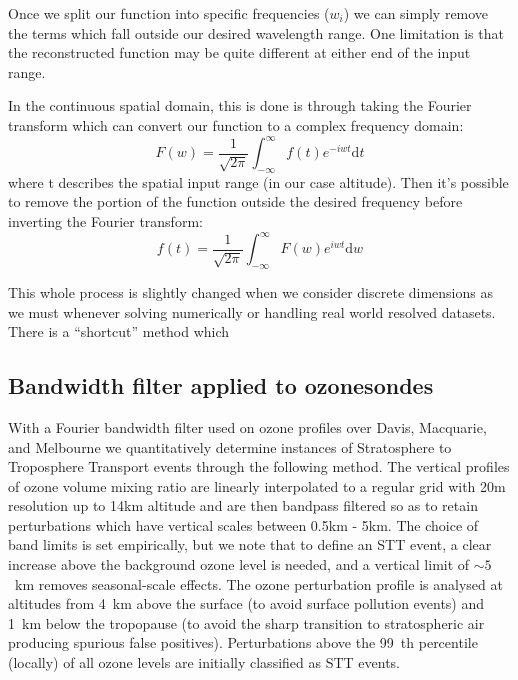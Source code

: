     Once we split our function into specific frequencies ($w_i$) we can simply remove the terms which fall outside our desired wavelength range.
    One limitation is that the reconstructed function may be quite different at either end of the input range.
    
    In the continuous spatial domain, this is done is through taking the Fourier transform which can convert our function to a complex frequency domain:
    \begin{equation*}
      F(w) = \frac{1}{\sqrt{2\pi}}\int_{-\infty}^{\infty}{ f(t) e^{-iwt} \mathrm{d}t }
    \end{equation*}
    where t describes the spatial input range (in our case altitude).
    Then it's possible to remove the portion of the function outside the desired frequency before inverting the Fourier transform:
    \begin{equation*}
      f(t) = \frac{1}{\sqrt{2\pi}}\int_{-\infty}^{\infty}{ F(w) e^{iwt} \mathrm{d}w }
    \end{equation*}
    
    This whole process is slightly changed when we consider discrete dimensions as we must whenever solving numerically or handling real world resolved datasets.
    There is a ``shortcut'' method which 
    
    
  \subsection{Bandwidth filter applied to ozonesondes}
    
    With a Fourier bandwidth filter used on ozone profiles over Davis, Macquarie, and Melbourne we quantitatively determine instances of Stratosphere to Troposphere Transport events through the following method.
    The vertical profiles of ozone volume mixing ratio are linearly interpolated to a regular grid with 20m resolution up to 14km altitude and are then bandpass filtered so as to retain perturbations which have vertical scales between 0.5km - 5km. 
    The choice of band limits is set empirically, but we note that to define an STT event, a clear increase above the background ozone level is needed, and a vertical limit of $\sim 5$~km removes seasonal-scale effects. 
    The ozone perturbation profile is analysed at altitudes from 4~km above the surface (to avoid surface pollution events) and 1~km below the tropopause (to avoid the sharp transition to stratospheric air producing spurious false positives). 
    Perturbations above the 99~th percentile (locally) of all ozone levels are initially classified as STT events.
    

